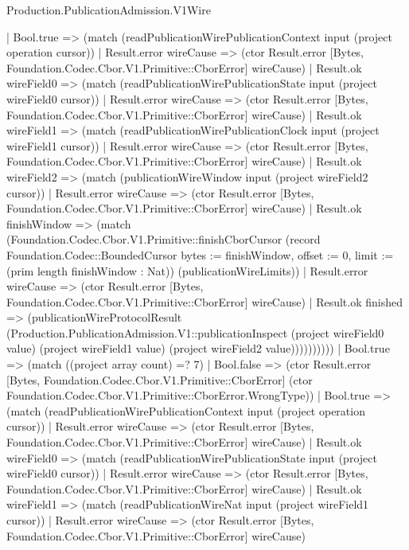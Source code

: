 \begin{lexlean}{Production.PublicationAdmission.V1Wire}
\begin{semanticmodule}
{                  | Bool.true => (match (readPublicationWirePublicationContext input (project operation cursor))
                    | Result.error wireCause => (ctor Result.error [Bytes, Foundation.Codec.Cbor.V1.Primitive::CborError] wireCause)
                    | Result.ok wireField0 => (match (readPublicationWirePublicationState input (project wireField0 cursor))
                      | Result.error wireCause => (ctor Result.error [Bytes, Foundation.Codec.Cbor.V1.Primitive::CborError] wireCause)
                      | Result.ok wireField1 => (match (readPublicationWirePublicationClock input (project wireField1 cursor))
                        | Result.error wireCause => (ctor Result.error [Bytes, Foundation.Codec.Cbor.V1.Primitive::CborError] wireCause)
                        | Result.ok wireField2 => (match (publicationWireWindow input (project wireField2 cursor))
                          | Result.error wireCause => (ctor Result.error [Bytes, Foundation.Codec.Cbor.V1.Primitive::CborError] wireCause)
                          | Result.ok finishWindow => (match (Foundation.Codec.Cbor.V1.Primitive::finishCborCursor (record Foundation.Codec::BoundedCursor {bytes := finishWindow, offset := 0, limit := (prim length finishWindow : Nat)}) (publicationWireLimits))
                            | Result.error wireCause => (ctor Result.error [Bytes, Foundation.Codec.Cbor.V1.Primitive::CborError] wireCause)
                            | Result.ok finished => (publicationWireProtocolResult (Production.PublicationAdmission.V1::publicationInspect (project wireField0 value) (project wireField1 value) (project wireField2 value))))))))))
              | Bool.true => (match ((project array count) =? 7)
                | Bool.false => (ctor Result.error [Bytes, Foundation.Codec.Cbor.V1.Primitive::CborError] (ctor Foundation.Codec.Cbor.V1.Primitive::CborError.WrongType))
                | Bool.true => (match (readPublicationWirePublicationContext input (project operation cursor))
                  | Result.error wireCause => (ctor Result.error [Bytes, Foundation.Codec.Cbor.V1.Primitive::CborError] wireCause)
                  | Result.ok wireField0 => (match (readPublicationWirePublicationState input (project wireField0 cursor))
                    | Result.error wireCause => (ctor Result.error [Bytes, Foundation.Codec.Cbor.V1.Primitive::CborError] wireCause)
                    | Result.ok wireField1 => (match (readPublicationWireNat input (project wireField1 cursor))
                      | Result.error wireCause => (ctor Result.error [Bytes, Foundation.Codec.Cbor.V1.Primitive::CborError] wireCause)
}
\end{semanticmodule}
\end{lexlean}
